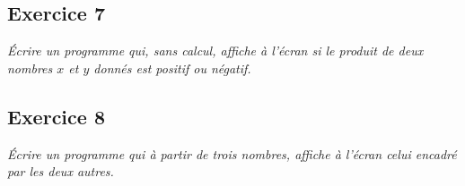 \documentclass[10pt]{article}
\newif\ifprof
\begin{document}
\subsection*{Exercice 7}
\textit{Écrire un programme qui, sans calcul, affiche à l'écran si le produit de deux nombres $x$ et $y$ donnés est positif ou négatif.}
\ifprof
\begin{corrige}
\begin{py}
\begin{python}
x=5
y=-2

if x<0<y or y<0<x:
    print("produit négatif !")
else:
    print("Produit positif !")

\end{python}
\end{py}
\end{corrige}
\else
\fi



\subsection*{Exercice 8}
\textit{Écrire un programme qui à partir de trois nombres, affiche à l'écran celui encadré par les deux autres.}

\ifprof
\begin{corrige}
\begin{py}
\begin{python}
x=-5
y=7
z=3

if x<=y:
    if y<=z:			# x <= y <= z 
        resultat=y
    elif z<=x:			# z <= x <=y
        resultat=x
    else:
        resultat=z		# x <= y et z ni à gauche ni à droite donc au milieu
else:  # y<x
    if x<=z:			# y < x <= z
        resultat=x		
    elif z<=y:			# z <= y < x
        resultat=y
    else:			# y < x et z ni à gauche ni à droite donc au milieu
        resultat=z
        
print(resultat)
\end{python}
\end{py}
\end{corrige}
\else
\fi
\end{document}
